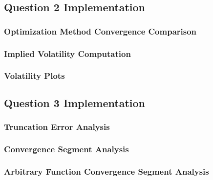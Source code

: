 \documentclass[10pt]{article}
\begin{document}
    \newpage
    \subsection{Question 2 Implementation}
        
        \subsubsection{Optimization Method Convergence Comparison} \label{appendix:source:q2:convergence}
            

        \subsubsection{Implied Volatility Computation} \label{appendix:source:q2:imp_vol}
            
        
        \subsubsection{Volatility Plots} \label{appendix:source:q2:vol_plots}
            

    \newpage
    \subsection{Question 3 Implementation} \label{appendix:q3}
        
        \subsubsection{Truncation Error Analysis} \label{appendix:q3:source:trunc_error}
            
        
        \subsubsection{Convergence Segment Analysis} \label{appendix:q3:source:convergence_analysis}
            

        \subsubsection{Arbitrary Function Convergence Segment Analysis} \label{appendix:q3:source:arb_convergence_analysis}
            

\end{document}
